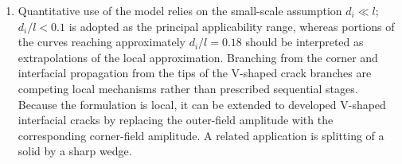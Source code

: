 \begin{enumerate}
\item
Quantitative use of the model relies on the small-scale assumption
$d_i\ll l$; $d_i/l<0.1$ is adopted as the principal applicability range,
whereas portions of the curves reaching approximately $d_i/l=0.18$ should
be interpreted as extrapolations of the local approximation. Branching
from the corner and interfacial propagation from the tips of the V-shaped crack
branches are competing local mechanisms rather than prescribed
sequential stages. Because the formulation is local, it can be extended
to developed V-shaped interfacial cracks by replacing the outer-field
amplitude with the corresponding corner-field amplitude. A related
application is splitting of a solid by a sharp wedge.
\end{enumerate}
